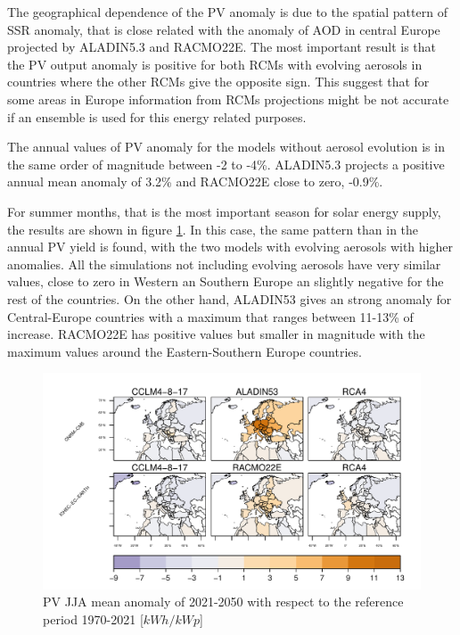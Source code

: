 The geographical dependence of the PV anomaly is due to the spatial pattern of SSR anomaly, that is close related with the anomaly of AOD in central Europe projected by ALADIN5.3 and RACMO22E. The most important result is that the PV output anomaly is positive for both RCMs with evolving aerosols in countries where the other RCMs give the opposite sign. This suggest that for some areas in Europe information from RCMs projections might be not accurate if an ensemble is used for this energy related purposes.

The annual values of PV anomaly for the models without aerosol evolution is in the same order of magnitude between -2 to -4\%. ALADIN5.3 projects a positive annual mean anomaly of 3.2\% and RACMO22E close to zero, -0.9\%.

For summer months, that is the most important season for solar energy supply, the results are shown in figure \ref{fig:pvcountryjja}. In this case, the same pattern than in the annual PV yield is found, with the two models with evolving aerosols with higher anomalies. All the simulations not including evolving aerosols have very similar values, close to zero in Western an Southern Europe an slightly negative for the rest of the countries. On the other hand, ALADIN53 gives an strong anomaly for Central-Europe countries with a maximum that ranges between 11-13\% of increase. RACMO22E has positive values but smaller in magnitude with the maximum values around the Eastern-Southern Europe countries.

\begin{figure}[h!]
    \includegraphics[width=1\textwidth]{figs/capitulo7/bycountryJJArelativePuOr.pdf}
    \caption{PV JJA mean anomaly of 2021-2050 with respect to the reference period 1970-2021 [$kWh/kWp$]}
\label{fig:pvcountryjja}
\end{figure}

